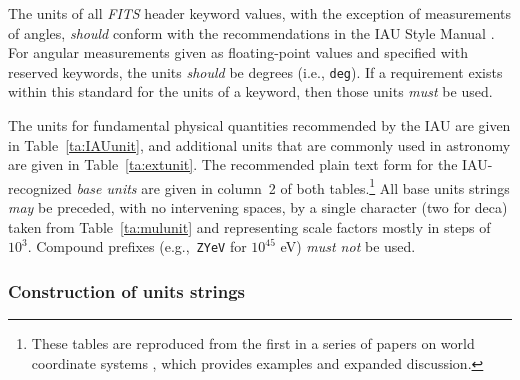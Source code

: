 \documentclass[onecolumn]{aa}
\begin{document}
 The units of all {\em FITS\/} header keyword values, with 
 the exception of measurements of angles, {\em should} 
 conform with the recommendations in the IAU Style 
 Manual \citep{mcnally88}. For angular 
 measurements given as floating-point values 
 and specified with reserved keywords, the units {\em should} be degrees
 (i.e., {\tt deg}). If a requirement exists within this standard for the 
 units of a keyword, then those units {\em must} be used.
 
 The units for fundamental physical quantities recommended by the 
 IAU are given in Table~\ref{ta:IAUunit}, and additional units that are 
 commonly used in astronomy are given in Table~\ref{ta:extunit}. 
The recommended plain text form for the IAU-recognized 
\textit{base units} are given in column~2 of both tables.\footnote{These 
tables are reproduced from the first 
in a series of papers on world coordinate systems \citep{greisen02}, which provides 
examples and expanded discussion.}
%
All base units strings {\em may} be preceded, with no intervening spaces, 
by a single character (two for deca) taken from Table~\ref{ta:mulunit} 
and representing scale factors mostly in steps of $10^3$. Compound 
prefixes (e.g.,~\verb+ZYeV+ for $10^{45}$ eV) {\em must not} be used.  



\subsubsection{Construction of units strings}
\end{document}
